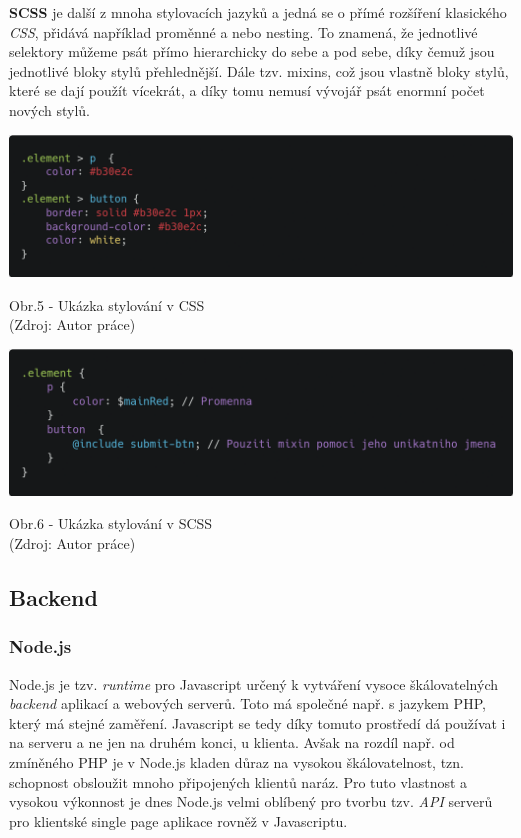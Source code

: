 \documentclass[12pt,a4paper]{report}
\begin{document}
  \textbf{SCSS} je další z mnoha stylovacích jazyků a jedná se o přímé rozšíření klasického \emph{CSS}, přidává
  například proměnné a nebo nesting. To znamená, že jednotlivé selektory můžeme psát přímo
  hierarchicky do sebe a pod sebe, díky čemuž jsou jednotlivé bloky stylů přehlednější. Dále tzv.
  mixins, což jsou vlastně bloky stylů, které se dají použít vícekrát, a díky tomu
  nemusí vývojář psát enormní počet nových stylů.
  
  \vspace*{0.5cm}
  \noindent\includegraphics[width=\linewidth]{cssCodeblock.png}
  \begin{center}
    Obr.5 - Ukázka stylování v CSS  \\
    (Zdroj: Autor práce)
  \end{center}

  \vspace*{0.5cm}\vspace*{0.5cm}
  \noindent\includegraphics[width=\linewidth]{scssCodeblock.png}
  \begin{center}
    Obr.6 -  Ukázka stylování v SCSS  \\
    (Zdroj: Autor práce)
  \end{center}
  \vspace*{0.5cm}

  \subsection{Backend}
  \subsubsection{Node.js}
  Node.js je tzv. \emph{runtime} pro Javascript určený k vytváření vysoce škálovatelných \emph{backend} aplikací a
  webových serverů. Toto má společné např. s jazykem PHP, který má stejné zaměření. Javascript se
  tedy díky tomuto prostředí dá používat i na serveru a ne jen na druhém konci, u klienta. Avšak na
  rozdíl např. od zmíněného PHP je v Node.js kladen důraz na vysokou škálovatelnost, tzn.
  schopnost obsloužit mnoho připojených klientů naráz. Pro tuto vlastnost a vysokou výkonnost je
  dnes Node.js velmi oblíbený pro tvorbu tzv. \emph{API} serverů pro klientské single page aplikace rovněž v
  Javascriptu. 
\end{document}
